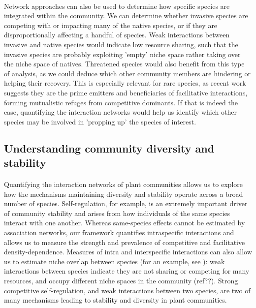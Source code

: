 \documentclass[a4,12pt]{article}
\begin{document}
        \paragraph{}
        Network approaches can also be used to determine how specific species are integrated within the community. We can determine whether invasive species are competing with or impacting many of the native species, or if they are disproportionally affecting a handful of species. Weak interactions between invasive and native species would indicate low resource sharing, such that the invasive species are probably exploiting 'empty' niche space rather taking over the niche space of natives. Threatened species would also benefit from this type of analysis, as we could deduce which other community members are hindering or helping their recovery. This is especially relevant for rare species, as recent work suggests they are the prime emitters and beneficiaries of facilitative interactions, forming mutualistic refuges from competitive dominants. If that is indeed the case, quantifying the interaction networks would help us identify which other species may be involved in 'propping up' the species of interest.  

      
    \subsection{Understanding community diversity and stability}

        \paragraph{}
        Quantifying the interaction networks of plant communities allows us to explore how the mechanisms maintaining diversity and stability operate across a broad number of species. Self-regulation, for example, is an extremely important driver of community stability \citep{Barabas2017} and arises from how individuals of the same species interact with one another. Whereas same-species effects cannot be estimated by association networks, our framework quantifies intraspecific interactions and allows us to measure the strength and prevalence of competitive and facilitative density-dependence. Measures of intra and interspecific interactions can also allow us to estimate niche overlap between species (for an example, see \citet{Chu2015a}): weak interactions between species indicate they are not sharing or competing for many resources, and occupy different niche spaces in the community (ref??). Strong competitive self-regulation, and weak interactions between two species, are two of many mechanisms leading to stability and diversity in plant communities.
\end{document}
